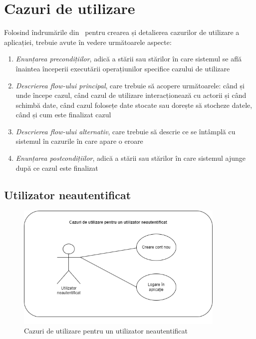 \section{Cazuri de utilizare}
Folosind îndrumările din~\cite{UseCasesGuidlines} pentru crearea și detalierea cazurilor de utilizare a aplicației, trebuie avute în vedere următoarele aspecte: 
\begin{enumerate}
    \setlength\itemsep{0.5em}
    \item {\it Enunțarea precondițiilor}, adică a stării sau stărilor în care sistemul se află înaintea începerii executării operațiunilor specifice cazului de utilizare
    \item {\it Descrierea flow-ului principal}, care trebuie să acopere următoarele: când și unde începe cazul, când cazul de utilizare interacționează cu actorii și când schimbă date, când cazul folosețe date stocate sau dorește să stocheze datele, când și cum este finalizat cazul
    \item {\it Descrierea flow-ului alternativ}, care trebuie să descrie ce se întâmplă cu sistemul în cazurile în care apare o eroare
    \item {\it Enunțarea postcondițiilor}, adică a stării sau stărilor în care sistemul ajunge după ce cazul este finalizat
  \end{enumerate}
\subsection{Utilizator neautentificat}

\begin{figure}[h]
	\centering
	\includegraphics[width=100mm]{figs/useCaseUnauthenticated.png}
    \caption{Cazuri de utilizare pentru un utilizator neautentificat}
	\label{fig:useCaseUnauthenticated}
\end{figure}

